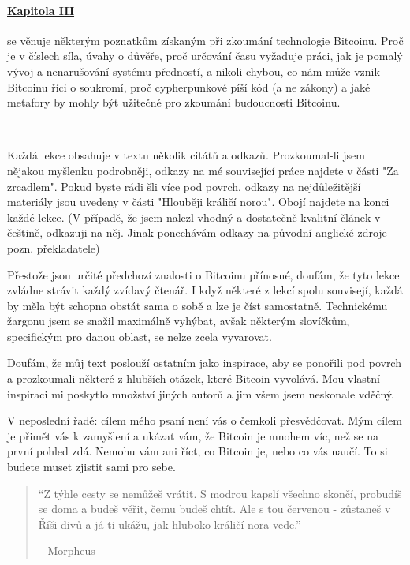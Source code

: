 \paragraph{\hyperref[ch:technology]{Kapitola III}}{se věnuje některým poznatkům 
získaným při zkoumání technologie Bitcoinu. Proč je v číslech síla, úvahy o důvěře, 
proč určování času vyžaduje práci, jak je pomalý vývoj a nenarušování systému 
předností, a nikoli chybou, co nám může vznik Bitcoinu říci o soukromí, proč 
cypherpunkové píší kód (a ne zákony) a jaké metafory by mohly být užitečné 
pro zkoumání budoucnosti Bitcoinu.}

~

Každá lekce obsahuje v textu několik citátů a odkazů. Prozkoumal-li jsem nějakou 
myšlenku podrobněji, odkazy na mé související práce najdete v části "Za zrcadlem". 
Pokud byste rádi šli více pod povrch, odkazy na nejdůležitější materiály jsou 
uvedeny v části "Hlouběji králičí norou". Obojí najdete na konci každé lekce. 
(V případě, že jsem nalezl vhodný a dostatečně kvalitní článek v češtině, odkazuji 
na něj. Jinak ponechávám odkazy na původní anglické zdroje - pozn. překladatele)

Přestože jsou určité předchozí znalosti o Bitcoinu přínosné, doufám, že tyto lekce 
zvládne strávit každý zvídavý čtenář. I když některé z lekcí spolu souvisejí, 
každá by měla být schopna obstát sama o sobě a lze je číst samostatně. Technickému 
žargonu jsem se snažil maximálně vyhýbat, avšak některým slovíčkům, specifickým 
pro danou oblast, se nelze zcela vyvarovat.

Doufám, že můj text poslouží ostatním jako inspirace, aby se ponořili pod povrch 
a prozkoumali některé z hlubších otázek, které Bitcoin vyvolává. Mou vlastní 
inspiraci mi poskytlo množství jiných autorů a jim všem jsem neskonale vděčný.

V neposlední řadě: cílem mého psaní není vás o čemkoli přesvědčovat. Mým cílem 
je přimět vás k zamyšlení a ukázat vám, že Bitcoin je mnohem víc, než se na první 
pohled zdá. Nemohu vám ani říct, co Bitcoin je, nebo co vás naučí. To si budete 
muset zjistit sami pro sebe.

\begin{quotation}\begin{samepage}
\enquote{Z týhle cesty se nemůžeš vrátit. S modrou kapslí všechno skončí, probudíš 
se doma a budeš věřit, čemu budeš chtít. Ale s tou červenou - zůstaneš v Říši divů 
a já ti ukážu, jak hluboko králičí nora vede.}
\begin{flushright} -- Morpheus
\end{flushright}\end{samepage}\end{quotation}

